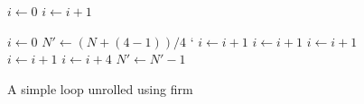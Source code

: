 \begin{figure}[h]
    \begin{minipage}[t]{0.5\textwidth}
        \centering
        \begin{algorithmic}
                \State $i \gets 0$
                    \State {}
                    \State $i \gets i + 1$
                \EndWhile
            \EndFunction
        \end{algorithmic}
    \end{minipage}
    \begin{minipage}[t]{0.5\textwidth}
        \centering
        \begin{algorithmic}
                \State $i \gets 0$
                \State $N' \gets (N + (4 - 1)) / 4$
`               
                        \State {}
                        \State $i \gets i + 1$
                    \EndCase
                        \State {}
                        \State $i \gets i + 1$
                    \EndCase
                        \State {}
                        \State $i \gets i + 1$
                    \EndCase
                        \State {}
                        \State $i \gets i + 1$
                    \EndCase
                \EndSwitch
                    \State {}
                    \State {}
                    \State {}
                    \State {}
                    \State $i \gets i + 4$
                    \State $N' \gets N' - 1$
                \EndWhile
            \EndFunction
        \end{algorithmic}
    \end{minipage}
    \caption{A simple loop unrolled using firm}
    \label{fig:basics:duff}
\end{figure}
